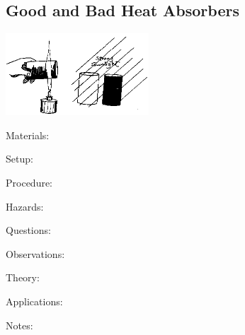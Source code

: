 \begin{multicols}{2}
\subsection{Good and Bad Heat Absorbers}

\begin{center}
\includegraphics[width=0.4\textwidth]{./img/source/good-bad-absorbers.png}
\end{center}

\begin{description*}
\item[Materials:]{}
\item[Setup:]{}
\item[Procedure:]{}
\item[Hazards:]{}
\item[Questions:]{}
\item[Observations:]{}
\item[Theory:]{}
\item[Applications:]{}
\item[Notes:]{}
\end{description*}



\end{multicols}

\pagebreak